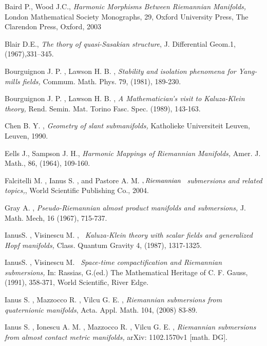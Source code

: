 \documentclass{amsart}
\theoremstyle{plain}
\numberwithin{equation}{section}
\begin{document}
\begin{thebibliography}{99}
 {\small Baird P., Wood J.C.}, {\small \emph{Harmonic Morphisms
Between Riemannian Manifolds,}} {\small London Mathematical Society
Monographs, 29, Oxford University Press, The Clarendon Press, Oxford, 2003}

 {\small Blair D.E., \emph{The thory of quasi-Sasakian structure},} {\small J. Differential Geom.1, (1967),331--345.}

 {\small Bourguignon J. P. , Lawson H. B. ,} {\small \emph{Stability and isolation phenomena for Yang-mills fields, }Commum. Math.
Phys. 79, (1981), 189-230.}

 {\small Bourguignon J. P. , Lawson H. B. ,} {\small \emph{A
Mathematician's visit to Kaluza-Klein theory,}} {\small Rend. Semin. Mat.
Torino Fasc. Spec. (1989), 143-163.}

 {\small Chen B. Y. ,} {\small \emph{Geometry of slant
submanifolds,} Katholieke Universiteit Leuven, Leuven, 1990.}

 {\small Eells J., Sampson J. H., } {\small \emph{Harmonic
Mappings of Riemannian Manifolds, }Amer. J. Math., 86, (1964), 109-160.}

 {\small Falcitelli M. , Ianus S. , and Pastore A. M. }$,{\small \emph{Riemannian}}$ {\small \emph{\ submersions and related topics,}}, {\small World Scientific Publishing Co., 2004.}

 {\small Gray A. ,} {\small \emph{Pseudo-Riemannian almost
product manifolds and submersions,} J. Math. Mech, 16 (1967), 715-737.}

 {\small IanusS. , Visinescu M. ,} {\small \emph{\ Kaluza-Klein
theory with scalar fields and generalized Hopf manifolds,}} {\small Class.
Quantum Gravity 4, (1987), 1317-1325.}

 {\small IanusS. , Visinescu M. \emph{\ Space-time
compactification and Riemannian submersions,}} {\small In: Rassias, G.(ed.)
The Mathematical Heritage of C. F.} {\small Gauss, (1991), 358-371, World
Scientific, River Edge.}

 {\small Ianus S. , Mazzocco R. , Vilcu G. E. ,} {\small 
\emph{Riemannian submersions from quaternionic manifolds}}, {\small Acta.
Appl. Math. 104, (2008) 83-89.}

 {\small Ianus S. , Ionescu A. M. , Mazzocco R. , Vilcu G. E.
,} {\small \emph{Riemannian submersions from almost contact metric manifolds,}} {\small arXiv: 1102.1570v1 [math. DG].}


\end{thebibliography}
\end{document}
